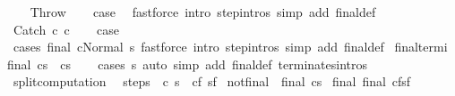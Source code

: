 \begin{isabellebody}
\isamarkupfalse%
\isanewline
\ \ \isamarkupfalse%
\ Throw\isanewline
\ \ \isamarkupfalse%
\ {\isacharquery}case\ \isamarkupfalse%
\ {\isacharparenleft}fastforce\ intro{\isacharcolon}\ step{\isachardot}intros\ simp\ add{\isacharcolon}\ final{\isacharunderscore}def{\isacharparenright}\isanewline
{}\isamarkupfalse%
\isanewline
\ \ \isamarkupfalse%
\ {\isacharparenleft}Catch\ c\ c\isanewline
\ \ \isamarkupfalse%
\ {\isacharquery}case\isanewline
\ \ \ \ \isamarkupfalse%
\ {\isacharparenleft}cases\ {\isachardoublequoteopen}final\ {\isacharparenleft}cNormal\ s{\isacharparenright}{\isachardoublequoteclose}{\isacharparenright}\ {\isacharparenleft}fastforce\ intro{\isacharcolon}\ step{\isachardot}intros\ simp\ add{\isacharcolon}\ final{\isacharunderscore}def{\isacharparenright}{\isacharplus}\isanewline
{}\isamarkupfalse%
%
\endisatagproof
{\isafoldproof}%
%
\isadelimproof
\isanewline
%
\endisadelimproof
\isanewline
{}\isamarkupfalse%
\ final{\isacharunderscore}termi{\isacharcolon}\isanewline
{\isachardoublequoteopen}final\ {\isacharparenleft}c{\isacharcomma}s{\isacharparenright}\ {\isasymLongrightarrow}\ {\isasymGamma}{\isasymturnstile}c{\isasymdown}s{\isachardoublequoteclose}\isanewline
%
\isadelimproof
\ \ %
\endisadelimproof
%
\isatagproof
{}\isamarkupfalse%
\ {\isacharparenleft}cases\ s{\isacharparenright}\ {\isacharparenleft}auto\ simp\ add{\isacharcolon}\ final{\isacharunderscore}def\ terminates{\isachardot}intros{\isacharparenright}%
\endisatagproof
{\isafoldproof}%
%
\isadelimproof
\isanewline
%
\endisadelimproof
\isanewline
\isanewline
{}\isamarkupfalse%
\ split{\isacharunderscore}computation{\isacharcolon}\ \isanewline
{}\ steps{\isacharcolon}\ {\isachardoublequoteopen}{\isasymGamma}{\isasymturnstile}\ {\isacharparenleft}c{\isacharcomma}\ s{\isacharparenright}\ {\isasymrightarrow}\isactrlsup {\isacharasterisk}\ {\isacharparenleft}c\isactrlsub f{\isacharcomma}\ s\isactrlsub f{\isacharparenright}{\isachardoublequoteclose}\isanewline
{}\ not{\isacharunderscore}final{\isacharcolon}\ {\isachardoublequoteopen}{\isasymnot}\ final\ {\isacharparenleft}c{\isacharcomma}s{\isacharparenright}{\isachardoublequoteclose}\isanewline
{}\ final{\isacharcolon}\ {\isachardoublequoteopen}final\ {\isacharparenleft}c\isactrlsub f{\isacharcomma}s\isactrlsub f{\isacharparenright}{\isachardoublequoteclose}\isanewline

\end{isabellebody}
